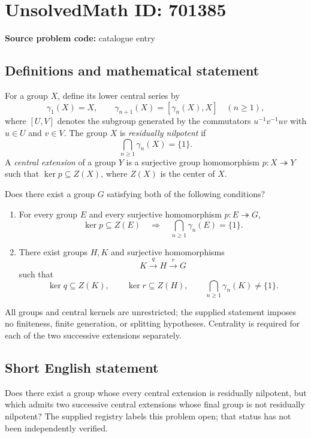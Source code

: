 \documentclass[11pt]{article}
\begin{document}
\section*{UnsolvedMath ID: 701385}
\textbf{Source problem code:} catalogue entry
\subsection{Definitions and mathematical statement}
For a group \(X\), define its lower central series by
\[
\gamma_1(X)=X,\qquad \gamma_{n+1}(X)=[\gamma_n(X),X]\quad(n\geq 1),
\]
where \([U,V]\) denotes the subgroup generated by the commutators \(u^{-1}v^{-1}uv\) with \(u\in U\) and \(v\in V\). The group \(X\) is \emph{residually nilpotent} if
\[
\bigcap_{n\geq 1}\gamma_n(X)=\{1\}.
\]
A \emph{central extension} of a group \(Y\) is a surjective group homomorphism \(p:X\twoheadrightarrow Y\) such that \(\ker p\subseteq Z(X)\), where \(Z(X)\) is the center of \(X\).

Does there exist a group \(G\) satisfying both of the following conditions?
\begin{enumerate}
\item For every group \(E\) and every surjective homomorphism \(p:E\twoheadrightarrow G\),
\[
\ker p\subseteq Z(E)\quad\Longrightarrow\quad
\bigcap_{n\geq 1}\gamma_n(E)=\{1\}.
\]
\item There exist groups \(H,K\) and surjective homomorphisms
\[
K\xrightarrow{\ q\ }H\xrightarrow{\ r\ }G
\]
such that
\[
\ker q\subseteq Z(K),\qquad \ker r\subseteq Z(H),\qquad
\bigcap_{n\geq 1}\gamma_n(K)\neq\{1\}.
\]
\end{enumerate}
All groups and central kernels are unrestricted; the supplied statement imposes no finiteness, finite generation, or splitting hypotheses. Centrality is required for each of the two successive extensions separately.
\subsection{Short English statement}
Does there exist a group whose every central extension is residually nilpotent, but which admits two successive central extensions whose final group is not residually nilpotent? The supplied registry labels this problem open; that status has not been independently verified.
\end{document}
